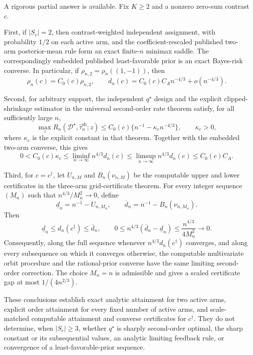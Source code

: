 A rigorous partial answer is available.  Fix \(K\geq2\) and a nonzero zero-sum contrast \(c\).

First, if \(|S_c|=2\), then contrast-weighted independent assignment, with probability \(1/2\) on each active arm, and the coefficient-rescaled published two-arm posterior-mean rule form an exact finite-\(n\) minimax saddle.  The correspondingly embedded published least-favorable prior is an exact Bayes-risk converse.  In particular, if \(\rho_{n,2}=\rho_n((1,-1))\), then
\[
 \rho_n(c)=C_0(c)\rho_{n,2},
 \qquad
 d_n(c)=C_0(c)C_A n^{-4/3}+o(n^{-4/3}).
\]

Second, for arbitrary support, the independent \(q^\star\) design and the explicit clipped-shrinkage estimator in the universal second-order rate theorem satisfy, for all sufficiently large \(n\),
\[
 \max_z R_n(\mathcal D^\star,\widehat\tau_n^{\mathrm{sh}};z)
 \leq C_0(c)\{n^{-1}-\kappa_c n^{-4/3}\},
 \qquad \kappa_c>0,
\]
where \(\kappa_c\) is the explicit constant in that theorem.  Together with the embedded two-arm converse, this gives
\[
 0<C_0(c)\kappa_c
 \leq\liminf_{n\to\infty}n^{4/3}d_n(c)
 \leq\limsup_{n\to\infty}n^{4/3}d_n(c)
 \leq C_0(c)C_A.
\]

Third, for \(c=c^\dagger\), let \(U_{n,M}\) and \(B_n(\nu_{n,M})\) be the computable upper and lower certificates in the three-arm grid-certificate theorem.  For every integer sequence \((M_n)\) such that \(n^{4/3}/M_n^2\to0\), define
\[
 \underline d_n=n^{-1}-U_{n,M_n},
 \qquad
 \overline d_n=n^{-1}-B_n(\nu_{n,M_n}).
\]
Then
\[
 \underline d_n\leq d_n(c^\dagger)\leq\overline d_n,
 \qquad
 0\leq n^{4/3}(\overline d_n-\underline d_n)
 \leq\frac{n^{4/3}}{4M_n^2}\longrightarrow0.
\]
Consequently, along the full sequence whenever \(n^{4/3}d_n(c^\dagger)\) converges, and along every subsequence on which it converges otherwise, the computable multivariate orbit procedure and the rational-prior converse have the same limiting second-order correction.  The choice \(M_n=n\) is admissible and gives a scaled certificate gap at most \(1/(4n^{2/3})\).

These conclusions establish exact analytic attainment for two active arms, explicit order attainment for every fixed number of active arms, and scale-matched computable attainment and converse certificates for \(c^\dagger\).  They do not determine, when \(|S_c|\geq3\), whether \(q^\star\) is sharply second-order optimal, the sharp constant or its subsequential values, an analytic limiting feedback rule, or convergence of a least-favorable-prior sequence.